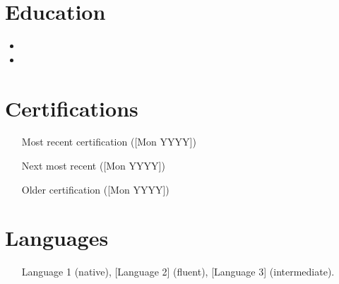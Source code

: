 \documentclass[11pt,a4paper,sans]{moderncv}
\begin{document}
\section{Education}
\vspace{1pt}
\begin{itemize}

\item{}

\vspace{3pt}

\item{}

\end{itemize}


\section{Certifications}
\vspace{1pt}
\begin{itemize}
\item [Most recent certification] ([Mon YYYY])
\item [Next most recent] ([Mon YYYY])
\item [Older certification] ([Mon YYYY])
\end{itemize}


\section{Languages}
\vspace{1pt}
\begin{itemize}
\item [Language 1] (native), [Language 2] (fluent), [Language 3] (intermediate).
\end{itemize}

\end{document}
